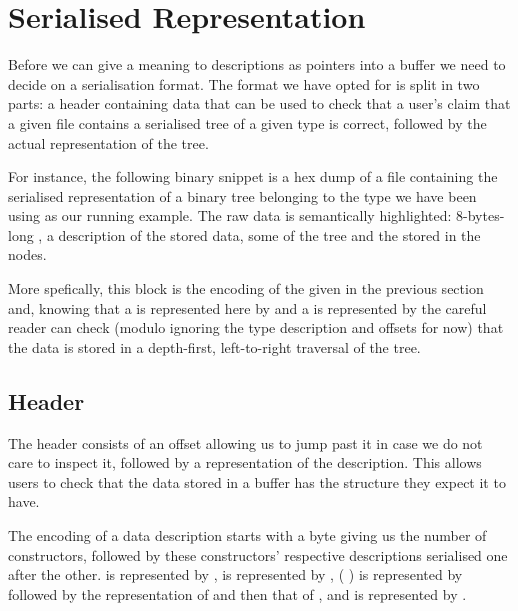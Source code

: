 \section{Serialised Representation}\label{sec:hexdump}

Before we can give a meaning to descriptions as pointers into a buffer we
need to decide on a serialisation format.
%
The format we have opted for is split in two parts: a header containing
data that can be used to check that a user's claim that a given file
contains a serialised tree of a given type is correct, followed by the
actual representation of the tree.


For instance, the following binary snippet is a hex dump of a file
containing the serialised representation of a binary tree belonging to
the type we have been using as our running example.
%
The raw data is semantically highlighted:
8-bytes-long ,
a  description of the stored data,
some  of the tree
and the  stored in the nodes.



More spefically, this block is the encoding of the 
given in the previous section and,
%
knowing that a  is represented here by 
and a  is represented by 
%
the careful reader can check
(modulo ignoring the type description and offsets for now)
that the data is stored in a depth-first, left-to-right traversal of the tree.


\subsection{Header}

The header consists of an offset allowing us to jump past it in case we do
not care to inspect it, followed by a representation of the 
description.
%
This allows users to check that the data stored in a buffer has the structure
they expect it to have.

The encoding of a data description starts with a byte giving us the number
of constructors, followed by these constructors' respective descriptions
serialised one after the other.
%
 is represented by ,
 is represented by ,
(  ) is represented by
 followed by the representation of  and then that of ,
and  is represented by .


